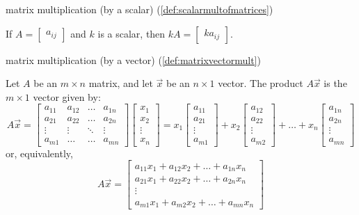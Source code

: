 \documentclass{ximera}
\begin{document}
matrix multiplication (by a scalar) (\ref{def:scalarmultofmatrices})
\begin{expandable}
    If $A=\begin{bmatrix} a_{ij}\end{bmatrix} $ and $k$ is a scalar,
then $kA=\begin{bmatrix} ka_{ij}\end{bmatrix}$. 
\end{expandable}

matrix multiplication (by a vector) (\ref{def:matrixvectormult})
\begin{expandable}
    Let $A$ be an $m\times n$ matrix, and let $\vec{x}$ be an $n\times 1$ vector.  The product $A\vec{x}$ is the $m\times 1$ vector given by:
$$A\vec{x}=\begin{bmatrix}
           a_{11} & a_{12}&\dots&a_{1n}\\
           a_{21}&a_{22} &\dots &a_{2n}\\
		\vdots & \vdots&\ddots &\vdots\\
		a_{m1}&\dots &\dots &a_{mn}
         \end{bmatrix}\begin{bmatrix}x_1\\x_2\\\vdots\\x_n\end{bmatrix}=
         x_1\begin{bmatrix}a_{11}\\a_{21}\\ \vdots \\a_{m1}\end{bmatrix}+
         x_2\begin{bmatrix}a_{12}\\a_{22}\\ \vdots \\a_{m2}\end{bmatrix}+\dots+
         x_n\begin{bmatrix}a_{1n}\\a_{2n}\\ \vdots \\a_{mn}\end{bmatrix}$$
or, equivalently,
$$A\vec{x}=\begin{bmatrix}a_{11}x_1+a_{12}x_2+\ldots +a_{1n}x_n\\a_{21}x_1+a_{22}x_2+\ldots +a_{2n}x_n\\\vdots\\a_{m1}x_1+a_{m2}x_2+\ldots +a_{mn}x_n\end{bmatrix}$$
\end{expandable}
\end{document}
